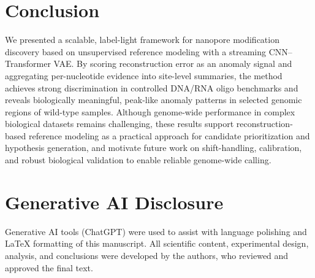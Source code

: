 \documentclass[journal,article,submit,pdftex,moreauthors]{Definitions/mdpi}
\begin{document}
\section{Conclusion}
We presented a scalable, label-light framework for nanopore modification discovery based on unsupervised reference modeling with a streaming CNN--Transformer VAE. By scoring reconstruction error as an anomaly signal and aggregating per-nucleotide evidence into site-level summaries, the method achieves strong discrimination in controlled DNA/RNA oligo benchmarks and reveals biologically meaningful, peak-like anomaly patterns in selected genomic regions of wild-type samples. Although genome-wide performance in complex biological datasets remains challenging, these results support reconstruction-based reference modeling as a practical approach for candidate prioritization and hypothesis generation, and motivate future work on shift-handling, calibration, and robust biological validation to enable reliable genome-wide calling.

\section*{Generative AI Disclosure}
Generative AI tools (ChatGPT) were used to assist with language polishing and \LaTeX{} formatting of this manuscript. All scientific content, experimental design, analysis, and conclusions were developed by the authors, who reviewed and approved the final text.
\end{document}
